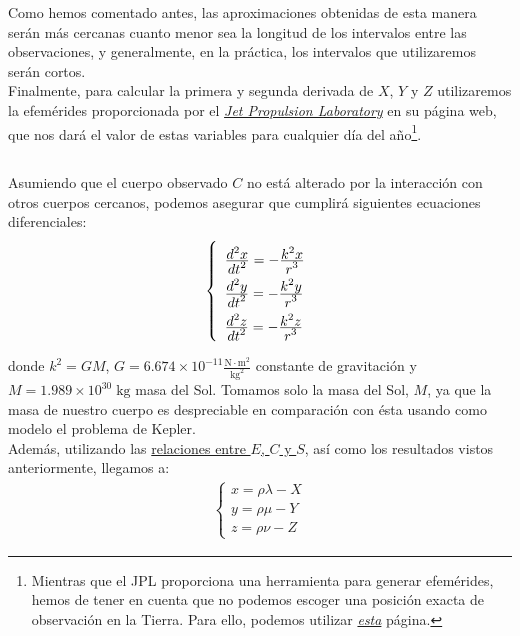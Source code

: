 \documentclass[11pt]{article}
\newcommand\ddfrac[2]{\frac{\displaystyle #1}{\displaystyle #2}}
\begin{document}
Como hemos comentado antes, las aproximaciones obtenidas de esta manera serán más cercanas cuanto menor sea la longitud de los intervalos entre las observaciones, y generalmente, en la práctica, los intervalos que utilizaremos serán cortos.\\

Finalmente, para calcular la primera y segunda derivada de $X$, $Y$ y $Z$ utilizaremos la efemérides proporcionada por el \href{https://ssd.jpl.nasa.gov/horizons.cgi}{\textit{Jet Propulsion Laboratory}} en su página web, que nos dará el valor de estas variables para cualquier día del año\footnote{Mientras que el JPL proporciona una herramienta para generar efemérides, hemos de tener en cuenta que no podemos escoger una posición exacta de observación en la Tierra. Para ello, podemos utilizar \href{http://xjubier.free.fr/en/site_pages/astronomy/ephemerides.html}{\textit{esta}} página.}.\\

\subsection{}
\label{subsec:ley_gravitacion}
Asumiendo que el cuerpo observado $C$ no está alterado por la interacción con otros cuerpos cercanos, podemos asegurar que cumplirá siguientes ecuaciones diferenciales:
\begin{align}
\left\{
\def\arraystretch{2}
\begin{array}{l}
	\ddfrac{d^2x}{dt^2}=-\ddfrac{k^2x}{r^3}\\
	\ddfrac{d^2y}{dt^2}=-\ddfrac{k^2y}{r^3}\\
	\ddfrac{d^2z}{dt^2}=-\ddfrac{k^2z}{r^3}
\end{array}
\right.
\label{eq:ley_gracitacion_C}
\end{align}

\noindent donde $k^2=GM$, $G=6.674\times10^{-11}\frac{\text{N}\cdot\text{m}^2}{\text{kg}^2}$ constante de gravitación y $M=1.989\times10^{30}\;\text{kg}$ masa del Sol. Tomamos solo la masa del Sol, $M$, ya que la masa de nuestro cuerpo es despreciable en comparación con ésta usando como modelo el problema de Kepler.\\

Además, utilizando las \hyperref[eq:terminologia]{relaciones entre $E$, $C$ y $S$}, así como los resultados vistos anteriormente, llegamos a:
\begin{align}
\left\{
\begin{array}{l}
	x=\rho\lambda-X\\
	y=\rho\mu-Y\\
	z=\rho\nu-Z
\end{array}
\right.
\label{eq:relacion_C_S_E}
\end{align}
\end{document}
